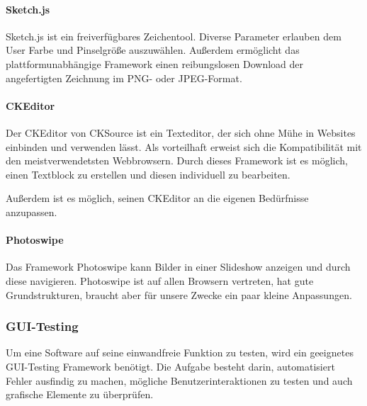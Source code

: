 
\paragraph{Sketch.js}
Sketch.js ist ein freiverfügbares Zeichentool. Diverse Parameter erlauben dem User Farbe und Pinselgröße auszuwählen. Außerdem ermöglicht das plattformunabhängige Framework einen reibungslosen Download der angefertigten Zeichnung im PNG- oder JPEG-Format. \cite{SKETCH}


\paragraph{CKEditor}
Der CKEditor von CKSource ist ein Texteditor, der sich ohne Mühe in Websites einbinden und verwenden lässt. Als vorteilhaft erweist sich die Kompatibilität mit den meistverwendetsten Webbrowsern. Durch dieses Framework ist es möglich, einen Textblock zu erstellen und diesen individuell zu bearbeiten.

Außerdem ist es möglich, seinen CKEditor an die eigenen Bedürfnisse anzupassen.\cite{CKEDITOR}


\paragraph{Photoswipe}
Das Framework Photoswipe kann Bilder in einer Slideshow anzeigen und durch diese navigieren. Photoswipe ist auf allen Browsern vertreten, hat gute Grundstrukturen, braucht aber für unsere Zwecke ein paar kleine Anpassungen. \cite{PHOTOSWIPE}


\newpage

\subsubsection{GUI-Testing}
Um eine Software auf seine einwandfreie Funktion zu testen, wird ein geeignetes GUI-Testing Framework benötigt. Die Aufgabe besteht darin, automatisiert Fehler ausfindig zu machen, mögliche Benutzerinteraktionen zu testen und auch grafische Elemente zu überprüfen. 

